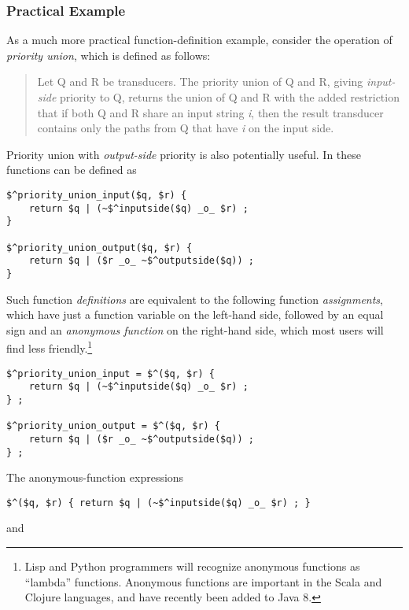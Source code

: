 \subsubsection{Practical Example}

As a much more practical function-definition example, consider the operation of \emph{priority union}, which is defined as follows:

\begin{quotation}
Let Q and R be transducers.  The priority union of Q and
R, giving \emph{input-side} priority to Q, returns the union of Q and R
with the added 
restriction that if both Q and R share an input string \emph{i}, then
the result transducer contains only the paths from Q that have
\emph{i} on the
input side.
\end{quotation}

\noindent
Priority union with \emph{output-side} priority is also potentially useful.
In \Kleene{} these functions can be defined as

\begin{Verbatim}
$^priority_union_input($q, $r) {
	return $q | (~$^inputside($q) _o_ $r) ;
}

$^priority_union_output($q, $r) {
	return $q | ($r _o_ ~$^outputside($q)) ;
}
\end{Verbatim}

\noindent
Such function \emph{definitions} are equivalent to the following function
\emph{assignments}, which have just a function variable on the left-hand side, followed by an equal sign
and an \emph{anonymous function} on the right-hand side, which most users will find less
friendly.\footnote{Lisp and Python programmers
will recognize anonymous functions as ``lambda'' functions.  Anonymous functions are important in the Scala
and Clojure languages, and have recently been added to Java 8.}  

\begin{Verbatim}
$^priority_union_input = $^($q, $r) {
	return $q | (~$^inputside($q) _o_ $r) ;
} ;

$^priority_union_output = $^($q, $r) {
	return $q | ($r _o_ ~$^outputside($q)) ;
} ;
\end{Verbatim}

\noindent
The anonymous-function expressions

\begin{Verbatim}
$^($q, $r) { return $q | (~$^inputside($q) _o_ $r) ; }
\end{Verbatim}

\noindent
and

